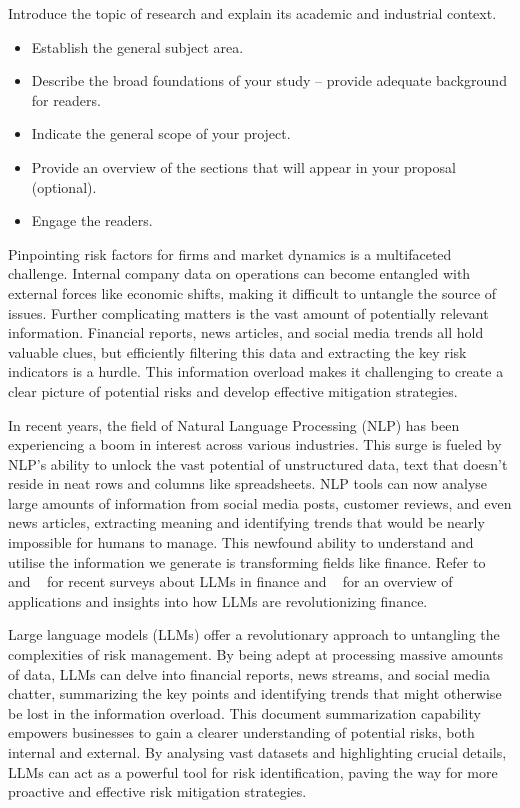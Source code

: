 Introduce the topic of research and explain its academic and industrial context.

\begin{itemize}
    \item Establish the general subject area.
    \item Describe the broad foundations of your study -- provide adequate background for readers.
    \item Indicate the general scope of your project.
    \item Provide an overview of the sections that will appear in your proposal (optional).
    \item Engage the readers.
\end{itemize}


Pinpointing risk factors for firms and market dynamics is a multifaceted challenge.
Internal company data on operations can become entangled with external forces like economic shifts, making it difficult
to untangle the source of issues.
Further complicating matters is the vast amount of potentially relevant information.
Financial reports, news articles, and social media trends all hold valuable clues, but efficiently filtering this data
and extracting the key risk indicators is a hurdle.
This information overload makes it challenging to create a clear picture of potential risks and develop effective
mitigation strategies.

In recent years, the field of Natural Language Processing (NLP) has been experiencing a boom in interest across various
industries.
This surge is fueled by NLP's ability to unlock the vast potential of unstructured data, text that doesn't reside in
neat rows and columns like spreadsheets.
NLP tools can now analyse large amounts of information from social media posts, customer reviews, and even news
articles, extracting meaning and identifying trends that would be nearly impossible for humans to manage.
This newfound ability to understand and utilise the information we generate is transforming fields like finance.
Refer to ~\cite{Lee2024} and ~\cite{Li2023} for recent surveys about LLMs in finance and ~\cite{Zhao2024} for an overview
of applications and insights into how LLMs are revolutionizing finance.

Large language models (LLMs) offer a revolutionary approach to untangling the complexities of risk management.
By being adept at processing massive amounts of data, LLMs can delve into financial reports, news streams, and social
media chatter, summarizing the key points and identifying trends that might otherwise be lost in the information
overload.
This document summarization capability empowers businesses to gain a clearer understanding of potential risks, both
internal and external.
By analysing vast datasets and highlighting crucial details, LLMs can act as a powerful tool for risk identification,
paving the way for more proactive and effective risk mitigation strategies.


